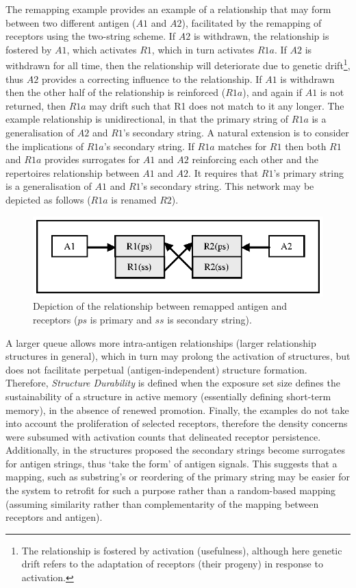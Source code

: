 The remapping example provides an example of a relationship that may form between two different antigen ($A1$ and $A2$), facilitated by the remapping of receptors using the two-string scheme. If $A2$ is withdrawn, the relationship is fostered by $A1$, which activates $R1$, which in turn activates $R1a$. If $A2$ is withdrawn for all time, then the relationship will deteriorate due to genetic drift\footnote{The relationship is fostered by activation (usefulness), although here genetic drift refers to the adaptation of receptors (their progeny) in response to activation.}, thus $A2$ provides a correcting influence to the relationship. If $A1$ is withdrawn then the other half of the relationship is reinforced ($R1a$), and again if $A1$ is not returned, then $R1a$ may drift such that R1 does not match to it any longer. The example relationship is unidirectional, in that the primary string of $R1a$ is a generalisation of $A2$ and $R1$'s secondary string. A natural extension is to consider the implications of $R1a$'s secondary string. If $R1a$ matches for $R1$ then both $R1$ and $R1a$ provides surrogates for $A1$ and $A2$ reinforcing each other and the repertoires relationship between $A1$ and $A2$. It requires that $R1$'s primary string is a generalisation of $A1$ and $R1$'s secondary string. This network may be depicted as follows ($R1a$ is renamed $R2$).

\begin{figure}[ht]
	\centering
	\includegraphics{Cells/network-remapped-example}
	\caption{Depiction of the relationship between remapped antigen and receptors ($ps$ is primary and $ss$ is secondary string).}
	\label{pic:cells:network:remappingspecific}
\end{figure}

A larger queue allows more intra-antigen relationships (larger relationship structures in general), which in turn may prolong the activation of structures, but does not facilitate perpetual (antigen-independent) structure formation. Therefore, \emph{Structure Durability} is defined when the exposure set size defines the sustainability of a structure in active memory (essentially defining short-term memory), in the absence of renewed promotion. Finally, the examples do not take into account the proliferation of selected receptors, therefore the density concerns were subsumed with activation counts that delineated receptor persistence. Additionally, in the structures proposed the secondary strings become surrogates for antigen strings, thus `take the form' of antigen signals. This suggests that a mapping, such as substring's or reordering of the primary string may be easier for the system to retrofit for such a purpose rather than a random-based mapping (assuming similarity rather than complementarity of the mapping between receptors and antigen).

